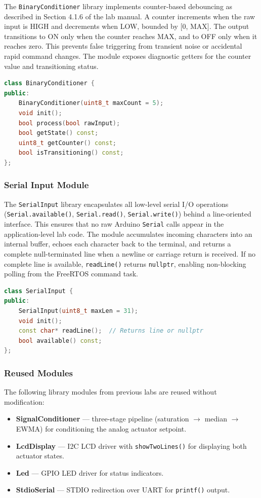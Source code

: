 The \texttt{BinaryConditioner} library implements counter-based debouncing as described in Section 4.1.6 of the lab manual. A counter increments when the raw input is HIGH and decrements when LOW, bounded by [0, MAX]. The output transitions to ON only when the counter reaches MAX, and to OFF only when it reaches zero. This prevents false triggering from transient noise or accidental rapid command changes. The module exposes diagnostic getters for the counter value and transitioning status.

\begin{lstlisting}[language=C++, caption={Binary conditioner interface (BinaryConditioner.h)}]
class BinaryConditioner {
public:
    BinaryConditioner(uint8_t maxCount = 5);
    void init();
    bool process(bool rawInput);
    bool getState() const;
    uint8_t getCounter() const;
    bool isTransitioning() const;
};
\end{lstlisting}

\subsubsection{Serial Input Module}

The \texttt{SerialInput} library encapsulates all low-level serial I/O operations (\texttt{Serial.available()}, \texttt{Serial.read()}, \texttt{Serial.write()}) behind a line-oriented interface. This ensures that no raw Arduino \texttt{Serial} calls appear in the application-level lab code. The module accumulates incoming characters into an internal buffer, echoes each character back to the terminal, and returns a complete null-terminated line when a newline or carriage return is received. If no complete line is available, \texttt{readLine()} returns \texttt{nullptr}, enabling non-blocking polling from the FreeRTOS command task.

\begin{lstlisting}[language=C++, caption={Serial input reader interface (SerialInput.h)}]
class SerialInput {
public:
    SerialInput(uint8_t maxLen = 31);
    void init();
    const char* readLine();  // Returns line or nullptr
    bool available() const;
};
\end{lstlisting}

\subsubsection{Reused Modules}

The following library modules from previous labs are reused without modification:

\begin{itemize}
    \item \textbf{SignalConditioner} --- three-stage pipeline (saturation $\rightarrow$ median $\rightarrow$ EWMA) for conditioning the analog actuator setpoint.
    \item \textbf{LcdDisplay} --- I2C LCD driver with \texttt{showTwoLines()} for displaying both actuator states.
    \item \textbf{Led} --- GPIO LED driver for status indicators.
    \item \textbf{StdioSerial} --- STDIO redirection over UART for \texttt{printf()} output.
\end{itemize}
